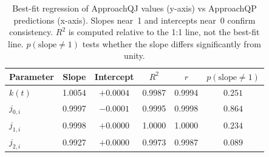 \begin{table}[h]
\centering
\begin{tabular}{lccccc}
\toprule
Parameter & Slope & Intercept & $R^2$ & $r$ & $p(\mathrm{slope} \neq 1)$ \\
\midrule
$k(t)$        & 1.0054 & $+0.0004$ & 0.9987 & 0.9994 & $0.251$ \\
$j_{0,i}$     & 0.9997 & $-0.0001$ & 0.9995 & 0.9998 & $0.864$ \\
$j_{1,i}$     & 0.9998 & $+0.0000$ & 1.0000 & 1.0000 & $0.234$ \\
$j_{2,i}$     & 0.9927 & $+0.0000$ & 0.9973 & 0.9987 & $0.089$ \\
\bottomrule
\end{tabular}
\caption{Best-fit regression of ApproachQJ values (y-axis) vs ApproachQP predictions (x-axis). Slopes near~1 and intercepts near~0 confirm consistency. $R^2$ is computed relative to the 1:1 line, not the best-fit line. $p(\mathrm{slope} \neq 1)$ tests whether the slope differs significantly from unity.}
\label{tab:ApproachQJ_vs_ApproachQP}
\end{table}